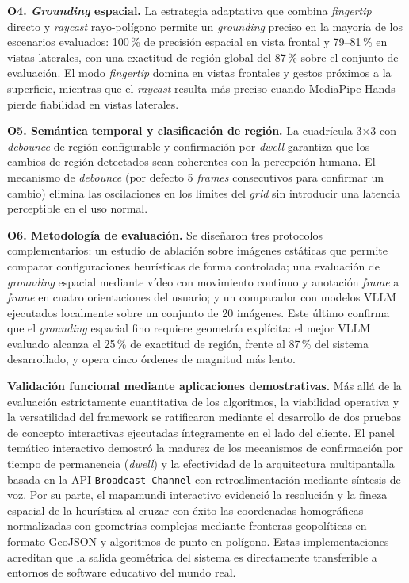 \documentclass[12pt]{report} %
\begin{document}
\textbf{O4. \textit{Grounding} espacial.} La estrategia adaptativa que combina \textit{fingertip} directo y \textit{raycast} rayo-polígono permite un \textit{grounding} preciso en la mayoría de los escenarios evaluados: 100\,\% de precisión espacial en vista frontal y 79--81\,\% en vistas laterales, con una exactitud de región global del 87\,\% sobre el conjunto de evaluación. El modo \textit{fingertip} domina en vistas frontales y gestos próximos a la superficie, mientras que el \textit{raycast} resulta más preciso cuando MediaPipe Hands pierde fiabilidad en vistas laterales.

\textbf{O5. Semántica temporal y clasificación de región.} La cuadrícula 3$\times$3 con \textit{debounce} de región configurable y confirmación por \textit{dwell} garantiza que los cambios de región detectados sean coherentes con la percepción humana. El mecanismo de \textit{debounce} (por defecto 5 \textit{frames} consecutivos para confirmar un cambio) elimina las oscilaciones en los límites del \textit{grid} sin introducir una latencia perceptible en el uso normal.

\textbf{O6. Metodología de evaluación.} Se diseñaron tres protocolos complementarios: un estudio de ablación sobre imágenes estáticas que permite comparar configuraciones heurísticas de forma controlada; una evaluación de \textit{grounding} espacial mediante vídeo con movimiento continuo y anotación \textit{frame} a \textit{frame} en cuatro orientaciones del usuario; y un comparador con modelos VLLM ejecutados localmente sobre un conjunto de 20 imágenes. Este último confirma que el \textit{grounding} espacial fino requiere geometría explícita: el mejor VLLM evaluado alcanza el 25\,\% de exactitud de región, frente al 87\,\% del sistema desarrollado, y opera cinco órdenes de magnitud más lento.

\textbf{Validación funcional mediante aplicaciones demostrativas.} Más allá de la evaluación estrictamente cuantitativa de los algoritmos, la viabilidad operativa y la versatilidad del framework se ratificaron mediante el desarrollo de dos pruebas de concepto interactivas ejecutadas íntegramente en el lado del cliente. El panel temático interactivo demostró la madurez de los mecanismos de confirmación por tiempo de permanencia (\textit{dwell}) y la efectividad de la arquitectura multipantalla basada en la API \texttt{Broadcast Channel} con retroalimentación mediante síntesis de voz. Por su parte, el mapamundi interactivo evidenció la resolución y la fineza espacial de la heurística al cruzar con éxito las coordenadas homográficas normalizadas con geometrías complejas mediante fronteras geopolíticas en formato GeoJSON y algoritmos de punto en polígono. Estas implementaciones acreditan que la salida geométrica del sistema es directamente transferible a entornos de software educativo del mundo real.
\end{document}
